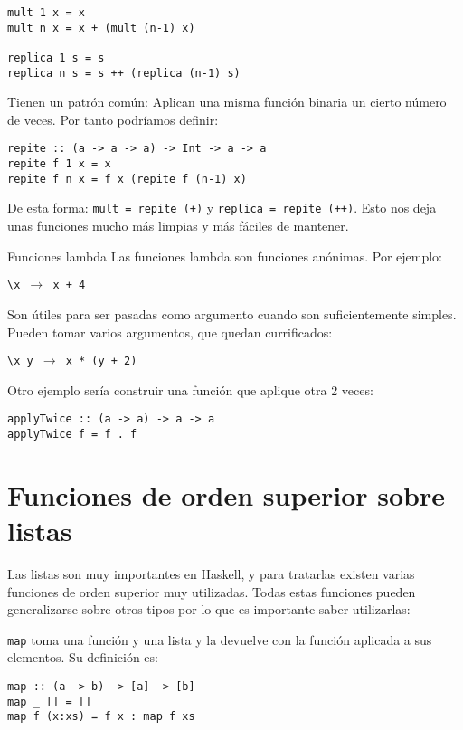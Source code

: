 \begin{lstlisting}
mult 1 x = x
mult n x = x + (mult (n-1) x)

replica 1 s = s
replica n s = s ++ (replica (n-1) s)
\end{lstlisting}

Tienen un patrón común: Aplican una misma función binaria un cierto número de
veces. Por tanto podríamos definir:

\begin{lstlisting}
repite :: (a -> a -> a) -> Int -> a -> a
repite f 1 x = x
repite f n x = f x (repite f (n-1) x)
\end{lstlisting}

De esta forma:
\texttt{mult = repite (+)} y \texttt{replica = repite (++)}.
Esto nos deja unas funciones mucho más limpias y más fáciles de mantener.

\begin{extra}{Funciones lambda}
Las funciones lambda son funciones anónimas. Por ejemplo:

\espacio

\texttt{\textbackslash x $\to$  x + 4}

\espacio

Son útiles para ser pasadas como argumento cuando son suficientemente simples.
Pueden tomar varios argumentos, que quedan currificados:

\espacio

\texttt{\textbackslash x y $\to$ x * (y + 2)}

\end{extra}

Otro ejemplo sería construir una función que aplique otra 2 veces:

\begin{lstlisting}
applyTwice :: (a -> a) -> a -> a
applyTwice f = f . f
\end{lstlisting}

\section{Funciones de orden superior sobre listas}
Las listas son muy importantes en Haskell, y para tratarlas existen varias
funciones de orden superior muy utilizadas. Todas estas funciones pueden
generalizarse sobre otros tipos por lo que es importante saber utilizarlas:

\texttt{map} toma una función y una lista y la devuelve con la función aplicada
a sus elementos. Su definición es:
\begin{lstlisting}
map :: (a -> b) -> [a] -> [b]
map _ [] = []
map f (x:xs) = f x : map f xs
\end{lstlisting}

